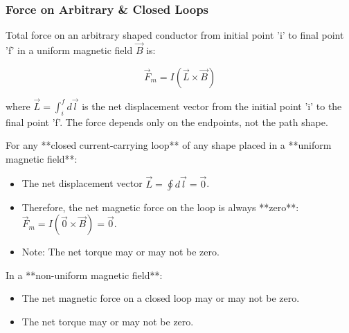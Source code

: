 \transfade[duration=0.5]

\begin{frame}[t]
    \frametitle{\textcolor{deepnavy}{\textbf{Force on Arbitrary & Closed Loops}}}
    \renewcommand{\familydefault}{\rmdefault}
    \small

      \item<+-> Total force on an arbitrary shaped conductor from initial point 'i' to final point 'f' in a uniform magnetic field $\vec{B}$ is:
        \begin{tcolorbox}[colback=blue!5,colframe=blue!80,boxrule=0.5pt,arc=1mm,boxsep=1pt]
        \begin{equation*}
             \vec{F}_m = I (\vec{L} \times \vec{B})
        \end{equation*}
        \end{tcolorbox}
          where $\vec{L} = \int_{i}^{f} d\vec{l}$ is the net displacement vector from the initial point 'i' to the final point 'f'. The force depends only on the endpoints, not the path shape.

    \vspace{1em}

      \item<+-> For any **closed current-carrying loop** of any shape placed in a **uniform magnetic field**:
        \begin{itemize}[<+->]
              \item The net displacement vector $\vec{L} = \oint d\vec{l} = \vec{0}$.
              \item Therefore, the net magnetic force on the loop is always **zero**: $\vec{F}_m = I (\vec{0} \times \vec{B}) = \vec{0}$.
              \item Note: The net torque may or may not be zero.
        \end{itemize}

    \vspace{1em}

      \item<+-> In a **non-uniform magnetic field**:
        \begin{itemize}
              \item The net magnetic force on a closed loop may or may not be zero.
              \item The net torque may or may not be zero.
        \end{itemize}
\end{frame}

